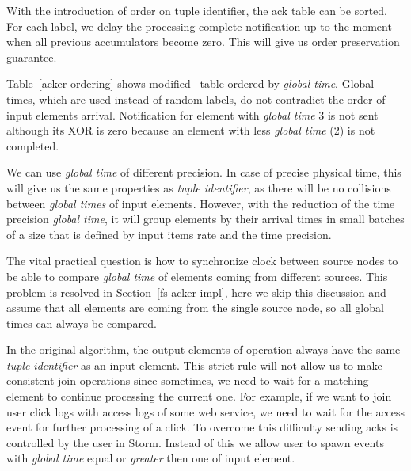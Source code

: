 With the introduction of order on tuple identifier, the ack table can be sorted. For each label, we delay the processing complete notification up to the moment when all previous accumulators become zero. This will give us order preservation guarantee.

Table~\ref{acker-ordering} shows modified \acker\ table ordered by \textit{global time}. Global times, which are used instead of random labels, do not contradict the order of input elements arrival. Notification for element with \textit{global time} 3 is not sent although its XOR is zero because an element with less \textit{global time} (2) is not completed.


We can use \textit{global time} of different precision. In case of precise physical time, this will give us the same properties as \textit{tuple identifier}, as there will be no collisions between \textit{global times} of input elements. However, with the reduction of the time precision \textit{global time}, it will group elements by their arrival times in small batches of a size that is defined by input items rate and the time precision.

The vital practical question is how to synchronize clock between source nodes to be able to compare \textit{global time} of elements coming from different sources. This problem is resolved in Section~\ref{fs-acker-impl}, here we skip this discussion and assume that all elements are coming from the single source node, so all global times can always be compared.

In the original algorithm, the output elements of operation always have the same \textit{tuple identifier} as an input element. This strict rule will not allow us to make consistent join operations since sometimes, we need to wait for a matching element to continue processing the current one. For example, if we want to join user click logs with access logs of some web service, we need to wait for the access event for further processing of a click. To overcome this difficulty sending acks is controlled by the user in Storm. Instead of this we allow user to spawn events with \textit{global time} equal or \textit{greater} then one of input element.


